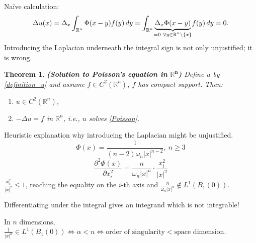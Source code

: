 \documentclass[12pt]{article}
\newtheorem{theorem}{Theorem}[section]
\theoremstyle{definition}
\begin{document}
Na\"{i}ve calculation:
\[\Delta u(x)=\Delta_x\int_{\mathbb{R}^n}\Phi(x-y)f(y)\,dy=\int_{\mathbb{R}^n}\underbrace{\Delta_x\Phi(x-y)}_{\mathclap{=0\ \forall y\in\mathbb{R}^n\setminus\{x\}}}f(y)\,dy=0.\]
Introducing the Laplacian underneath the integral sign is not only unjustified; it is wrong.



\begin{theorem}\label{Poisson_sol}
\emph{\textbf{(Solution to Poisson's equation in $\boldsymbol{\mathbb{R}^n}$)}} Define $u$ by \eqref{definition_u} and assume $f\in C^2(\mathbb{R}^n)$, $f$ has compact support. Then:
\begin{enumerate}[label=(\roman*)]
\item $u\in C^2(\mathbb{R}^n)$,
\item $-\Delta u=f$ in $\mathbb{R}^n$, i.e., $u$ solves \eqref{Poisson}.
\end{enumerate}
\end{theorem}

Heuristic explanation why introducing the Laplacian might be unjustified.
\[\Phi(x)=\frac{1}{(n-2)\omega_n|x|^{n-2}},\ n\geq3\]
\[\frac{\partial^2\Phi(x)}{\partial x_i^2}=\frac{n}{\omega_n|x|^n}\cdot\frac{x_i^2}{|x|^2}\]
$\frac{x_i^2}{|x|^2}\leq1$, reaching the equality on the $i$-th axis and $\frac{n}{\omega_n|x|^n}\notin L^1(B_1(0))$.

Differentiating under the integral gives an integrand which is not integrable!

In $n$ dimensions, $\frac{1}{|x|^{\alpha}}\in L^1(B_1(0))\Leftrightarrow\alpha<n\Leftrightarrow\text{order of singularity}<\text{space dimension}$.
\end{document}
